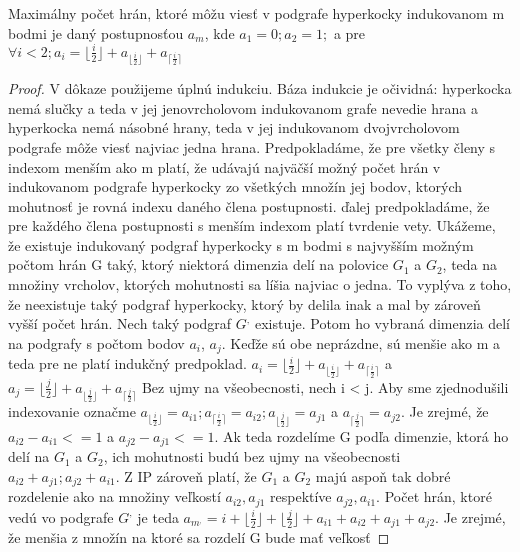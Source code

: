 \begin{lem}
Maximálny počet hrán, ktoré môžu viesť v podgrafe hyperkocky indukovanom m
bodmi je daný postupnosťou $a_{m}$, kde $a_{1} = 0; a_{2} = 1;$ a pre 
$\forall i < 2; a_{i} = \lfloor \frac {i}{2} \rfloor + a_{\lfloor \frac{i}{2}
\rfloor}
+ a_{\lceil \frac {i}{2} \rceil } $
\end{lem}
\begin{proof}
V dôkaze použijeme úplnú indukciu. Báza indukcie je očividná: hyperkocka
nemá slučky a teda v jej jenovrcholovom indukovanom grafe nevedie 
hrana a hyperkocka nemá
násobné hrany, teda v jej indukovanom dvojvrcholovom podgrafe 
môže viesť najviac jedna hrana. Predpokladáme, že pre všetky členy s
indexom menším ako m platí, že udávajú najväčší možný počet hrán v
indukovanom podgrafe hyperkocky zo všetkých množín jej bodov, ktorých 
mohutnosť je rovná  indexu daného člena postupnosti. ďalej predpokladáme, že
pre každého člena postupnosti s menším indexom platí tvrdenie vety.
Ukážeme, že existuje indukovaný podgraf hyperkocky s m bodmi 
s najvyšším možným počtom hrán G taký, ktorý niektorá dimenzia delí na
polovice $G_{1}$ a $G_{2}$, teda na množiny vrcholov, ktorých mohutnosti sa líšia najviac o
jedna. To vyplýva z toho, že neexistuje taký podgraf hyperkocky, 
ktorý by delila inak a mal by zároveň vyšší počet hrán.
Nech taký podgraf $G^{,}$ existuje. Potom ho vybraná dimenzia delí na podgrafy s
počtom bodov $a_{i}$, $a_{j}$. Keďže sú obe neprázdne, sú menšie ako m a teda
pre ne platí indukčný predpoklad. $a_{i} = \lfloor \frac {i}{2} \rfloor + 
a_{\lfloor \frac{i}{2} \rfloor}+ a_{\lceil \frac {i}{2} \rceil }$ a $a_{j} = 
\lfloor \frac {j}{2} \rfloor + 
a_{\lfloor \frac{j}{2} \rfloor}+ a_{\lceil \frac {j}{2} \rceil }$
Bez ujmy na všeobecnosti, nech i < j. Aby sme zjednodušili indexovanie
označme $a_{\lfloor \frac{i}{2} \rfloor} = a_{i1}; a_{\lceil \frac {i}{2} \rceil }
= a_{i2}; a_{\lfloor \frac{j}{2} \rfloor} = a_{j1}$ a $a_{\lceil \frac {j}{2} \rceil }
= a_{j2}$.
Je zrejmé, že $a_{i2} - a_{i1} <= 1$ a $a_{j2} - a_{j1} <= 1$. Ak teda
rozdelíme G podľa dimenzie, ktorá ho delí na $G_{1}$ a $G_{2}$, ich mohutnosti
budú bez ujmy na všeobecnosti $a_{i2} + a_{j1}; a_{j2} + a_{i1}$. Z IP
zároveň platí, že $G_{1}$ a $G_{2}$ majú aspoň tak dobré rozdelenie ako na
množiny veľkostí $a_{i2}, a_{j1}$ respektíve $a_{j2}, a_{i1}$.
Počet hrán, ktoré vedú vo podgrafe $G^{,}$ je teda
$a_{m^{,}}=i + \lfloor \frac{i}{2} \rfloor 
+ \lfloor \frac{j}{2} \rfloor + a_{i1} + a_{i2} + a_{j1} + a_{j2}$.
Je zrejmé, že menšia z množín na ktoré sa rozdelí G bude mať veľkosť

\end{proof}
